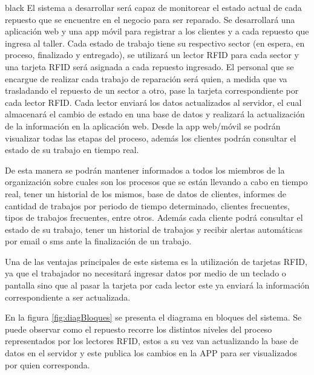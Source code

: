 \documentclass[11pt]{charter}
\begin{document}
\begin{consigna}{black}
El sistema a desarrollar será capaz de monitorear el estado actual de cada repuesto que se encuentre en el negocio para ser reparado.
Se desarrollará una aplicación web y una app móvil para registrar a los clientes y a cada repuesto que ingresa al taller.
Cada estado de trabajo tiene su respectivo sector (en espera, en proceso, finalizado y entregado), se utilizará un lector RFID para cada sector y una tarjeta RFID será asignada a cada repuesto ingresado.
El personal que se encargue de realizar cada trabajo de reparación será quien, a medida que va trasladando el repuesto de un sector a otro, pase la tarjeta correspondiente por cada lector RFID. 
Cada lector enviará los datos actualizados al servidor, el cual almacenará el cambio de estado en una base de datos y realizará la actualización de la información en la aplicación web.
Desde la app web/móvil se podrán visualizar todas las etapas del proceso, además los clientes podrán consultar el estado de su trabajo en tiempo real.

De esta manera se podrán mantener informados a todos los miembros de la organización sobre cuales son los procesos que se están llevando a cabo en tiempo real, tener un historial de los mismos, base de datos de clientes, informes de cantidad de trabajos por periodo de tiempo determinado, clientes frecuentes, tipos de trabajos frecuentes, entre otros.
Además cada cliente podrá consultar el estado de su trabajo, tener un historial de trabajos y recibir alertas automáticas por email o sms ante la finalización de un trabajo.

Una de las ventajas principales de este sistema es la utilización de tarjetas RFID, ya que el trabajador no necesitará ingresar datos por medio de un teclado o pantalla sino que al pasar la tarjeta por cada lector este ya enviará la información correspondiente a ser actualizada.

En la figura \ref{fig:diagBloques} se presenta el diagrama en bloques del sistema. Se puede observar como el repuesto recorre los distintos niveles del proceso representados por los lectores RFID, estos a su vez van actualizando la base de datos en el servidor y este publica los cambios en la APP para ser visualizados por quien corresponda.

\vspace{25px}


\end{consigna}
\end{document}
